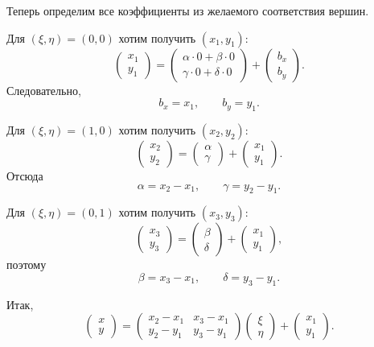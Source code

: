 \documentclass[a4paper,14pt]{extarticle}
\begin{document}
	Теперь определим все коэффициенты из желаемого соответствия вершин.
	
	Для \((\xi,\eta)=(0,0)\) хотим получить \((x_1,y_1)\):
	\[
	\begin{pmatrix}x_1\\y_1\end{pmatrix}
	=
	\begin{pmatrix}
		\alpha\cdot0+\beta\cdot0\\
		\gamma\cdot0+\delta\cdot0
	\end{pmatrix}
	+
	\begin{pmatrix}b_x\\b_y\end{pmatrix}.
	\]
	Следовательно,
	\[
	b_x=x_1,\qquad b_y=y_1.
	\]
	
	Для \((\xi,\eta)=(1,0)\) хотим получить \((x_2,y_2)\):
	\[
	\begin{pmatrix}x_2\\y_2\end{pmatrix}
	=
	\begin{pmatrix}\alpha\\\gamma\end{pmatrix}
	+
	\begin{pmatrix}x_1\\y_1\end{pmatrix}.
	\]
	Отсюда
	\[
	\alpha=x_2-x_1,\qquad \gamma=y_2-y_1.
	\]
	
	Для \((\xi,\eta)=(0,1)\) хотим получить \((x_3,y_3)\):
	\[
	\begin{pmatrix}x_3\\y_3\end{pmatrix}
	=
	\begin{pmatrix}\beta\\\delta\end{pmatrix}
	+
	\begin{pmatrix}x_1\\y_1\end{pmatrix},
	\]
	поэтому
	\[
	\beta=x_3-x_1,\qquad \delta=y_3-y_1.
	\]
	
	Итак,
	\[
	\boxed{
		\begin{pmatrix}x\\y\end{pmatrix}
		=
		\begin{pmatrix}
			x_2-x_1&x_3-x_1\\
			y_2-y_1&y_3-y_1
		\end{pmatrix}
		\begin{pmatrix}\xi\\\eta\end{pmatrix}
		+
		\begin{pmatrix}x_1\\y_1\end{pmatrix}.
	}
	\]
	
\end{document}
